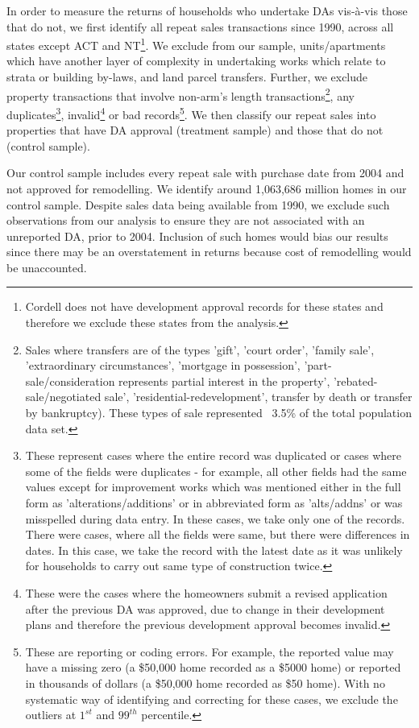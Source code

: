\documentclass[AEJ,reqno, draftmode]{AEA} %
\begin{document}
In order to measure the returns of households who undertake DAs vis-à-vis those that do not, we first identify all repeat sales transactions since 1990, across all states except ACT and NT\footnote{Cordell does not have development approval records for these states and therefore we exclude these states from the analysis.}. We exclude from our sample, units/apartments which have another layer of complexity in undertaking works which relate to strata or building by-laws, and land parcel transfers. Further, we exclude property transactions that involve non-arm's length transactions\footnote{Sales where transfers are of the types 'gift', 'court order', 'family sale', 'extraordinary circumstances', 'mortgage in possession', 'part-sale/consideration represents partial interest in the property', 'rebated-sale/negotiated sale', 'residential-redevelopment', transfer by death or transfer by bankruptcy). These types of sale represented ~3.5\% of the total population data set.}, any duplicates\footnote{These represent cases where the entire record was duplicated or cases where some of the fields were duplicates - for example, all other fields had the same values except for improvement works which was mentioned either in the full form as 'alterations/additions' or in abbreviated form  as 'alts/addns' or was misspelled during data entry. In these cases, we take only one of the records. There were cases, where all the fields were same, but there were differences in dates. In this case, we take the record with the latest date as it was unlikely for households to carry out same type of construction twice.}, invalid\footnote{These were the cases where the homeowners submit a revised application after the previous DA was approved, due to change in their development plans and therefore the previous development approval becomes invalid.} or bad records\footnote{These are reporting or coding errors. For example, the reported value may have a missing zero (a \$50,000 home recorded as a \$5000 home) or reported in thousands of dollars (a \$50,000 home recorded as \$50 home). With no systematic way of identifying and correcting for these cases, we exclude the outliers at $1^{st}$ and $99^{th}$ percentile.}. We then classify our repeat sales into properties that have DA approval (treatment sample) and those that do not (control sample). 

Our control sample includes every repeat sale with purchase date from 2004 and not approved for remodelling. We identify around 1,063,686 million homes in our control sample. Despite sales data being available from 1990, we exclude such observations from our analysis to ensure they are not associated with an unreported DA, prior to 2004. Inclusion of such homes would bias our results since there may be an overstatement in returns because cost of remodelling would be unaccounted.
\end{document}
